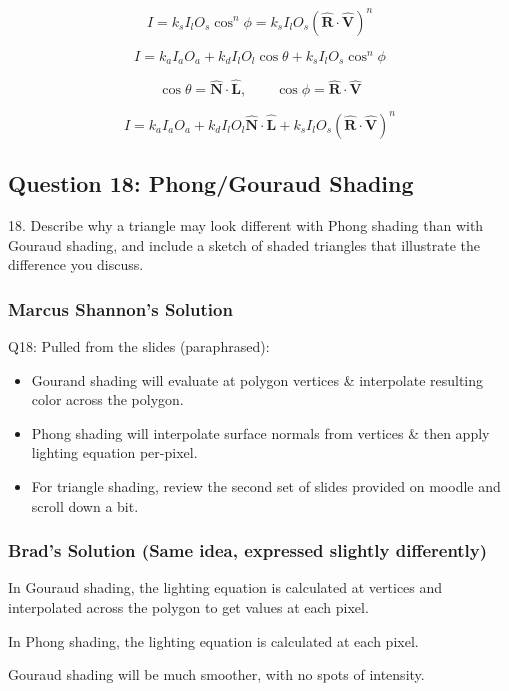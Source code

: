 \documentclass[11pt]{article}
\begin{document}
\begin{spacing}{1.2}
$$I = k_s I_l O_s \cos^n \phi = k_s I_l O_s \left(\hat{\mathbf{R}} \cdot \hat{\mathbf{V}}\right) ^n$$


$$ I = k_a I_a O_a + k_d I_l O_l \cos \theta + k_s I_l O_s \cos^n \phi$$

$$\cos \theta = \hat{\mathbf{N}} \cdot \hat{\mathbf{L}}, \qquad 
\cos \phi = \hat{\mathbf{R}} \cdot \hat{\mathbf{V}}$$

$$ I = k_a I_a O_a + k_d I_l O_l \hat{\mathbf{N}} \cdot \hat{\mathbf{L}} + k_s I_l O_s \left(\hat{\mathbf{R}} \cdot \hat{\mathbf{V}}\right)^n$$

\subsection{Question 18: Phong/Gouraud Shading}
18.  Describe why a triangle may look different with Phong shading than with Gouraud shading, and include a sketch of shaded triangles that illustrate the difference you discuss. 

\subsubsection{Marcus Shannon's Solution}

Q18: Pulled from the slides (paraphrased):
\begin{itemize}
    \item Gourand shading will evaluate at polygon vertices \& interpolate resulting color across the polygon.
    \item Phong shading will interpolate surface normals from vertices \& then apply lighting equation per-pixel.
    \item For triangle shading, review the second set of slides provided on moodle and scroll down a bit.
\end{itemize}

\subsubsection{Brad's Solution (Same idea, expressed slightly differently)}

In Gouraud shading, the lighting equation is calculated at vertices and interpolated across the polygon to get values at each pixel.  

In Phong shading, the lighting equation is calculated at each pixel.  

Gouraud shading will be much smoother, with no spots of intensity.  


\end{spacing}
\end{document}
